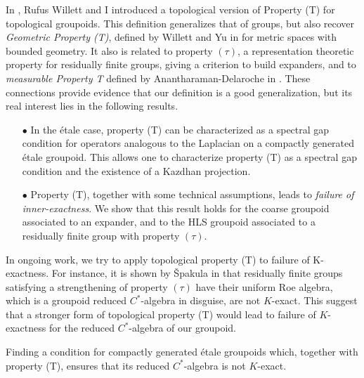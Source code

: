 In \cite{DellWillett}, Rufus Willett and I introduced a topological version of Property (T) for topological groupoids. This definition generalizes that of groups, but also recover \textit{Geometric Property (T)}, defined by Willett and Yu in \cite{WillettYu} for metric spaces with bounded geometry. It also is related to property $( \tau )$, a representation theoretic property for residually finite groups, giving a criterion to build expanders, and to \textit{measurable Property T} defined by Anantharaman-Delaroche in \cite{anantharamanT}. These connections provide evidence that our definition is a good generalization, but its real interest lies in the following results.\\
\begin{itemize}
\item[$\bullet$] In the \'etale case, property (T) can be characterized as a spectral gap condition for operators analogous to the Laplacian on a compactly generated \'etale groupoid. This allows one to characterize property (T) as a spectral gap condition and the existence of a Kazdhan projection. \\
\item[$\bullet$] Property (T), together with some technical assumptions, leads to \textit{failure of inner-exactness}. We show that this result holds for the coarse groupoid associated to an expander, and to the HLS groupoid associated to a residually finite group with property $(\tau )$. \\
\end{itemize}
In ongoing work, we try to apply topological property (T) to failure of K-exactness. For instance, it is shown by \v{S}pakula in \cite{SpakulaNonexact} that residually finite groups satisfying a strengthening of property $(\tau)$ have their uniform Roe algebra, which is a groupoid reduced $C^*$-algebra in disguise, are not $K$-exact. This suggest that a stronger form of topological property (T) would lead to failure of $K$-exactness for the reduced $C^*$-algebra of our groupoid. %

\begin{project}
Finding a condition for compactly generated \'etale groupoids which, together with property (T), ensures that its reduced $C^*$-algebra is not $K$-exact. 
\end{project}


